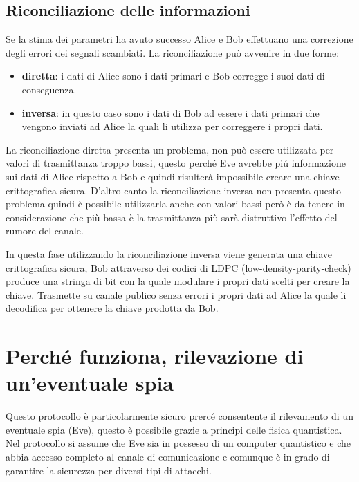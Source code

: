 \subsection{Riconciliazione delle informazioni}\label{subse:riconciliazione}
Se la stima dei parametri ha avuto successo Alice e Bob effettuano una correzione degli errori dei segnali scambiati. La riconciliazione pu\`o avvenire in due forme: 

\begin{itemize}
\item \textbf{diretta}: i dati di Alice sono i dati primari e Bob corregge i suoi dati di conseguenza.
\item \textbf{inversa}: in questo caso sono i dati di Bob ad essere i dati primari che vengono inviati ad Alice la quali li utilizza per correggere i propri dati.
\end{itemize} 
 
La riconciliazione diretta presenta un problema, non pu\`o essere utilizzata per valori di trasmittanza troppo bassi, questo perch\'e Eve avrebbe pi\'u informazione sui dati di Alice rispetto a Bob e quindi risulter\`a impossibile creare una chiave crittografica sicura. D'altro canto la riconciliazione inversa non presenta questo problema quindi \`e possibile utilizzarla anche con valori bassi per\`o \`e da tenere in considerazione che pi\`u bassa \`e la trasmittanza pi\`u sar\`a distruttivo l'effetto del rumore del canale.

In questa fase utilizzando la riconciliazione inversa viene generata una chiave crittografica sicura, Bob attraverso dei codici di LDPC (low-density-parity-check) produce una stringa di bit con la quale modulare i propri dati scelti per creare la chiave. Trasmette su canale publico senza errori i propri dati ad Alice la quale li decodifica per ottenere la chiave prodotta da Bob.

\section{Perché funziona, rilevazione di un'eventuale spia}
Questo protocollo \`e particolarmente sicuro prerc\'e consentente il rilevamento di un eventuale spia (Eve), questo \`e possibile grazie a principi delle fisica quantistica. Nel protocollo si assume che Eve sia in possesso di un computer quantistico e che abbia accesso completo al canale di comunicazione e comunque \`e in grado di garantire la sicurezza per diversi tipi di attacchi.

